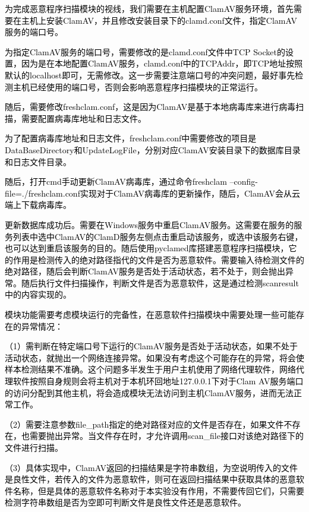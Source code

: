 \textcolor{black}{为完成恶意程序扫描模块的视线，我们需要在主机配置ClamAV服务环境，首先需要在主机上安装ClamAV，并且修改安装目录下的clamd.conf文件，指定ClamAV服务的端口号。}

\textcolor{black}{为指定ClamAV服务的端口号，需要修改的是clamd.conf文件中TCP Socket的设置，因为是在本地配置ClamAV服务，clamd.conf中的TCPAddr，即TCP地址按照默认的localhost即可，无需修改。这一步需要注意端口号的冲突问题，最好事先检测主机已经使用的端口号，否则会影响恶意程序扫描模块的正常运行。}

\textcolor{black}{随后，需要修改freshclam.conf，这是因为ClamAV是基于本地病毒库来进行病毒扫描，需要配置病毒库地址和日志文件。}

\textcolor{black}{为了配置病毒库地址和日志文件，freshclam.conf中需要修改的项目是DataBaseDirectory和UpdateLogFile，分别对应ClamAV安装目录下的数据库目录和日志文件目录。}

\textcolor{black}{随后，打开cmd手动更新ClamAV病毒库，通过命令freshclam –config-file=./freshclam.conf实现对于ClamAV病毒库的更新操作，随后，ClamAV会从云端上下载病毒库。}

\textcolor{black}{更新数据库成功后。需要在Windows服务中重启ClamAV服务。这需要在服务的服务列表中选中ClamAV的ClamD服务左侧点击重启动该服务，或选中该服务右键，也可以达到重启该服务的目的。随后使用pyclamed库搭建恶意程序扫描模块，它的作用是检测传入的绝对路径指代的文件是否为恶意软件。需要输入待检测文件的绝对路径，随后会判断ClamAV服务是否处于活动状态，若不处于，则会抛出异常。随后执行文件扫描操作，判断文件是否为恶意软件，这是通过检测scanresult中的内容实现的。}

\textcolor{black}{模块功能需要考虑模块运行的完备性，在恶意软件扫描模块中需要处理一些可能存在的异常情况：}

\textcolor{black}{（1）需判断在特定端口号下运行的ClamAV服务是否处于活动状态，如果不处于活动状态，就抛出一个网络连接异常。如果没有考虑这个可能存在的异常，将会使样本检测结果不准确。这个问题多半发生于用户主机使用了网络代理软件，网络代理软件按照自身规则会将主机对于本机环回地址127.0.0.1下对于Clam AV服务端口的访问分配到其他主机，将会造成模块无法访问到主机ClamAV服务，进而无法正常工作。}

\textcolor{black}{（2）需要注意参数file\_path指定的绝对路径对应的文件是否存在，如果文件不存在，也需要抛出异常。当文件存在时，才允许调用scan\_file接口对该绝对路径下的文件进行扫描。}

\textcolor{black}{（3）具体实现中，ClamAV返回的扫描结果是字符串数组，为空说明传入的文件是良性文件，若传入的文件为恶意软件，则可在返回扫描结果中获取具体的恶意软件名称，但是具体的恶意软件名称对于本实验没有作用，不需要传回它们，只需要检测字符串数组是否为空即可判断文件是良性文件还是恶意软件。}

